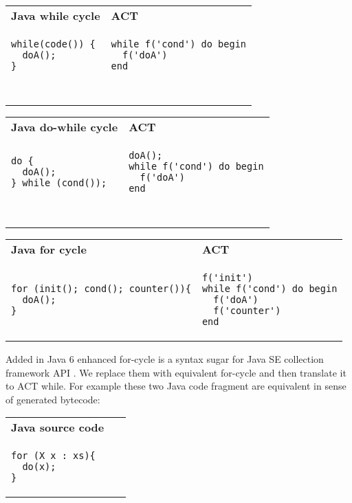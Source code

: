\begin{tabular}{ p{6cm} p{6cm} }
\textbf{Java while cycle} & \textbf{ACT} \\
\begin{verbatim}
while(code()) {
  doA();
}
\end{verbatim} 
  & 
\begin{verbatim}
while f('cond') do begin
  f('doA')
end
\end{verbatim}
\\~\\
\end{tabular}

\begin{tabular}{ p{6cm} p{6cm} }
\textbf{Java do-while cycle} & \textbf{ACT} \\
\begin{verbatim}
do {
  doA();
} while (cond());
\end{verbatim} 
  & 
\begin{verbatim}
doA();
while f('cond') do begin
  f('doA')
end
\end{verbatim}
\\~\\
\end{tabular}

\begin{tabular}{ p{6cm} p{6cm} }
\textbf{Java for cycle} & \textbf{ACT} \\
\begin{verbatim}
for (init(); cond(); counter()){
  doA();
}
\end{verbatim} 
  & 
\begin{verbatim}
f('init')
while f('cond') do begin
  f('doA')
  f('counter')
end
\end{verbatim}
\end{tabular}

Added in Java 6 enhanced for-cycle is a syntax sugar for Java SE collection framework API \cite{oracle2015oracle}.
We replace them with equivalent for-cycle and then translate it to ACT while.
For example these two Java code fragment are equivalent in sense of generated bytecode:\\

\begin{tabular}{ p{6cm} p{6cm} }
\textbf{Java source code} & ~ \\
\begin{verbatim}
for (X x : xs){
  do(x);
}
\end{verbatim} 
  & 
~
\end{tabular}


